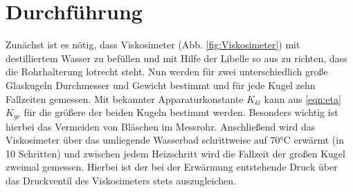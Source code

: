 \section{Durchführung}
\label{sec:Durchführung}
Zunächst ist es nötig, dass Viskosimeter (Abb. \ref{fig:Viskosimeter}) mit
destilliertem Wasser zu befüllen und mit Hilfe der Libelle so aus zu richten,
dass die Rohrhalterung lotrecht steht. Nun werden für zwei unterschiedlich große
Glaskugeln Durchmesser und Gewicht bestimmt und für jede Kugel zehn Fallzeiten
gemessen. Mit bekannter Apparaturkonstante $K_{kl}$ kann aus \eqref{eqn:eta} $K_{gr}$
für die größere der beiden Kugeln bestimmt werden. Besonders wichtig ist hierbei das
Vermeiden von Bläschen im Messrohr.
Anschließend wird das Viskosimeter über das umliegende Wasserbad schrittweise auf
$70 \si{\celsius}$ erwärmt (in 10 Schritten) und zwischen jedem Heizschritt wird
die Fallzeit der großen Kugel zweimal gemessen. Hierbei ist der bei der Erwärmung
entstehende Druck über das Druckventil des Viskosimeters stets auszugleichen.
